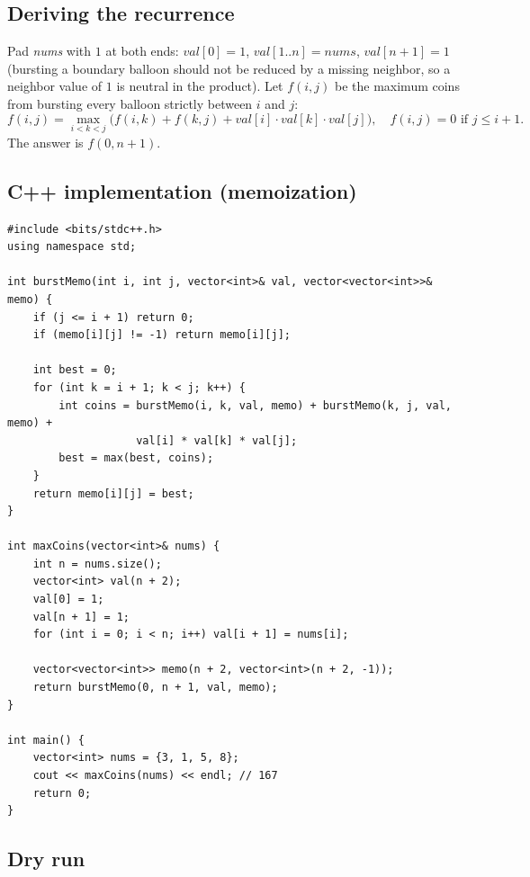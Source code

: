 \subsection*{Deriving the recurrence}

Pad \textit{nums} with $1$ at both ends: $\textit{val}[0]=1$,
$\textit{val}[1..n]=\textit{nums}$, $\textit{val}[n{+}1]=1$ (bursting a
boundary balloon should not be reduced by a missing neighbor, so a
neighbor value of $1$ is neutral in the product). Let $f(i,j)$ be the
maximum coins from bursting every balloon strictly between $i$ and $j$:
\[
  f(i,j) = \max_{i<k<j} \Big( f(i,k) + f(k,j) +
  \textit{val}[i]\cdot\textit{val}[k]\cdot\textit{val}[j] \Big),
  \quad f(i,j)=0 \text{ if } j \le i+1.
\]
The answer is $f(0, n{+}1)$.

\subsection*{C++ implementation (memoization)}

\begin{lstlisting}
#include <bits/stdc++.h>
using namespace std;

int burstMemo(int i, int j, vector<int>& val, vector<vector<int>>& memo) {
    if (j <= i + 1) return 0;
    if (memo[i][j] != -1) return memo[i][j];

    int best = 0;
    for (int k = i + 1; k < j; k++) {
        int coins = burstMemo(i, k, val, memo) + burstMemo(k, j, val, memo) +
                    val[i] * val[k] * val[j];
        best = max(best, coins);
    }
    return memo[i][j] = best;
}

int maxCoins(vector<int>& nums) {
    int n = nums.size();
    vector<int> val(n + 2);
    val[0] = 1;
    val[n + 1] = 1;
    for (int i = 0; i < n; i++) val[i + 1] = nums[i];

    vector<vector<int>> memo(n + 2, vector<int>(n + 2, -1));
    return burstMemo(0, n + 1, val, memo);
}

int main() {
    vector<int> nums = {3, 1, 5, 8};
    cout << maxCoins(nums) << endl; // 167
    return 0;
}
\end{lstlisting}

\subsection*{Dry run}


